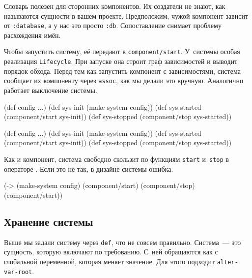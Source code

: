 \fi

Словарь полезен для сторонних компонентов. Их создатели не знают, как называются
сущности в вашем проекте. Предположим, чужой компонент зависит от
\verb|:database|, а у нас это просто \verb|:db|. Сопоставление снимает проблему
расхождения имён.

Чтобы запустить систему, её передают в \verb|component/start|. У~системы
особая реализация \verb|Lifecycle|. При запуске она строит граф зависимостей и
выводит порядок обхода. Перед тем как запустить компонент с зависимостями,
система сообщает их компоненту через \verb|assoc|, как мы делали это
вручную. Аналогично работает выключение системы.

\ifnarrow

\begin{english}
  \begin{clojure}
(def config {...})
(def sys-init (make-system config))
(def sys-started
  (component/start sys-init))
(def sys-stopped
  (component/stop sys-started))
  \end{clojure}
\end{english}

\else

\begin{english}
  \begin{clojure}
(def config {...})
(def sys-init (make-system config))
(def sys-started (component/start sys-init))
(def sys-stopped (component/stop sys-started))
  \end{clojure}
\end{english}

\fi

Как и компонент, система свободно скользит по функциям \verb|start|
и~\verb|stop| в операторе \arr. Если это не так, в дизайне системы ошибка.

\begin{english}
  \begin{clojure}
(-> (make-system config)
    (component/start)
    (component/stop)
    (component/start))
  \end{clojure}
\end{english}

\subsection{Хранение системы}


Выше мы задали систему через \verb|def|, что не совсем правильно. Система~--- это
сущность, которую включают по требованию. С~ней обращаются как с глобальной
переменной, которая меняет значение. Для этого подходит \verb|alter-var-root|.

